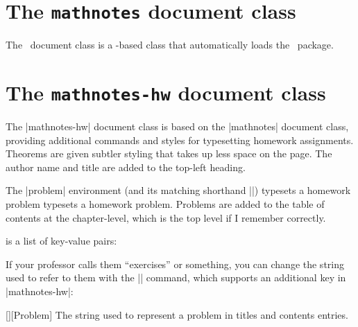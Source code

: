 \documentclass{ltxguidex}
\newcommand{\mn}{\ctan{mathnotes}}
\begin{document}
\section{The \texttt{mathnotes} document class}

The \mn\ document class is a -based class that automatically loads
the \mn\ package.

\section{The \texttt{mathnotes-hw} document class}

The |mathnotes-hw| document class is based on the |mathnotes| document class,
providing additional commands and styles for typesetting homework assignments.
Theorems are given subtler styling that takes up less space on the page.
The author name and title are added to the top-left heading.


The |problem| environment (and its matching shorthand |\prob|) typesets a
homework problem typesets a homework problem. Problems are added to the table of
contents at the chapter-level, which is the top level if I remember correctly.

 is a list of key-value pairs:


If your professor calls them ``exercises'' or something, you can change the
string used to refer to them with the |\mathnotes| command, which supports an
additional key in |mathnotes-hw|:
\begin{keys}
  [][Problem]
    The string used to represent a problem in titles and contents entries.
\end{keys}
\end{document}
